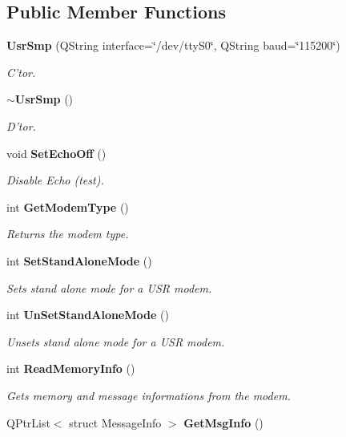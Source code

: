 \subsection*{Public Member Functions}
\begin{CompactItemize}
\item 
{\bf Usr\-Smp} (QString interface=\char`\"{}/dev/tty\-S0\char`\"{}, QString baud=\char`\"{}115200\char`\"{})
\begin{CompactList}\small\item\em C'tor. \item\end{CompactList}\item 
{\bf $\sim$Usr\-Smp} ()
\begin{CompactList}\small\item\em D'tor. \item\end{CompactList}\item 
void {\bf Set\-Echo\-Off} ()
\begin{CompactList}\small\item\em Disable Echo (test). \item\end{CompactList}\item 
int {\bf Get\-Modem\-Type} ()\label{classUsrSmp_a3}

\begin{CompactList}\small\item\em Returns the modem type. \item\end{CompactList}\item 
int {\bf Set\-Stand\-Alone\-Mode} ()
\begin{CompactList}\small\item\em Sets stand alone mode for a USR modem. \item\end{CompactList}\item 
int {\bf Un\-Set\-Stand\-Alone\-Mode} ()
\begin{CompactList}\small\item\em Unsets stand alone mode for a USR modem. \item\end{CompactList}\item 
int {\bf Read\-Memory\-Info} ()
\begin{CompactList}\small\item\em Gets memory and message informations from the modem. \item\end{CompactList}\item 
QPtr\-List$<$ struct Message\-Info $>$ {\bf Get\-Msg\-Info} ()\label{classUsrSmp_a7}


\end{CompactItemize}
